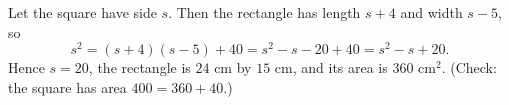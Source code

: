 Let the square have side $s$. Then the rectangle has length $s+4$ and width $s-5$, so
\[
s^2=(s+4)(s-5)+40=s^2-s-20+40=s^2-s+20 .
\]
Hence $s=20$, the rectangle is $24\text{ cm}$ by $15\text{ cm}$, and its area is $\boxed{360}\text{ cm}^2$. (Check: the square has area $400=360+40$.)
